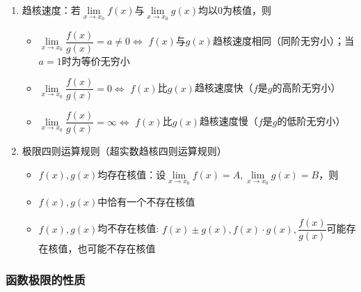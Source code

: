 \documentclass[../book.tex]{subfiles}
\begin{document}
\begin{enumerate}
        \item 趋核速度：若$\lim\limits_{x\to x_0} f(x)$与$\lim\limits_{x\to x_0} g(x)$均以$0$为核值，则
        \begin{itemize}
            \item $\lim\limits_{x\to x_0} \dfrac{f(x)}{g(x)} = a \neq 0 \Leftrightarrow$ $f(x)$与$g(x)$趋核速度相同（同阶无穷小）；当$a = 1$时为等价无穷小
            \item $\lim\limits_{x\to x_0} \dfrac{f(x)}{g(x)} = 0 \Leftrightarrow$ $f(x)$比$g(x)$趋核速度快（$f$是$g$的高阶无穷小）
            \item $\lim\limits_{x\to x_0} \dfrac{f(x)}{g(x)} = \infty \Leftrightarrow$ $f(x)$比$g(x)$趋核速度慢（$f$是$g$的低阶无穷小）
        \end{itemize}

        \item 极限四则运算规则（超实数趋核四则运算规则）
        \begin{itemize}
            \item $f(x), g(x)$均存在核值：设$\lim\limits_{x\to x_0} f(x) = A, \lim\limits_{x\to x_0} g(x) = B$，则
            \item $f(x), g(x)$中恰有一个不存在核值
            \item $f(x), g(x)$均不存在核值: $f(x) \pm g(x), f(x)\cdot g(x), \dfrac{f(x)}{g(x)}$可能存在核值，也可能不存在核值
        \end{itemize}

    \end{enumerate}

    \subsubsection{函数极限的性质}
\end{document}
